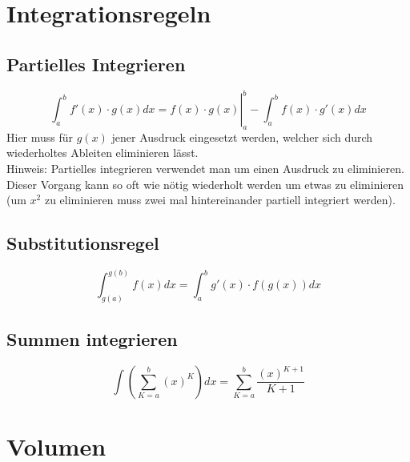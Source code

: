 



\section{Integrationsregeln}
\subsection{Partielles Integrieren}
\[ \boxed{\left. \int_a^b f'(x) \cdot g(x) dx = f(x) \cdot g(x) \right|_a^b - 
\int_a^b f(x) \cdot g'(x) dx} \]
Hier muss für $g(x)$ jener Ausdruck eingesetzt werden, welcher sich durch 
wiederholtes Ableiten eliminieren lässt.\\
Hinweis: Partielles integrieren verwendet man um einen Ausdruck zu eliminieren.
Dieser Vorgang kann so oft wie nötig wiederholt werden um etwas zu eliminieren 
(um $x^2$ zu eliminieren muss zwei mal hintereinander partiell integriert 
werden).
\subsection{Substitutionsregel}
\[ \boxed{\int_{g(a)}^{g(b)} f(x) dx = \int_{a}^{b} g'(x) \cdot f(g(x)) dx} \]

\subsection{Summen integrieren}
\[ \boxed{ \int \left( \sum_{K=a}^{b} (x)^K \right) dx= \sum_{K=a}^b 
\frac{(x)^{K+1}}{K+1} } \]

\section{Volumen}
